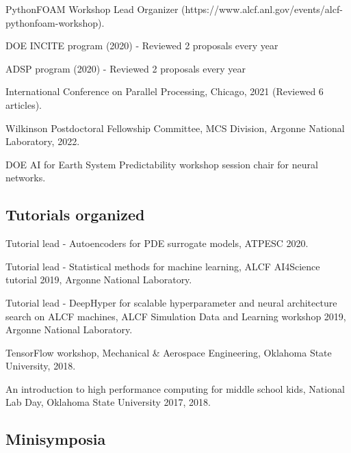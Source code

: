 \documentclass[letterpaper]{article}
\renewenvironment{itemize}{
  \begin{list}{}{
    \setlength{\leftmargin}{1.5em}
  }
}{
  \end{list}
}
\begin{document}
\begin{itemize}
\item PythonFOAM Workshop Lead Organizer (https://www.alcf.anl.gov/events/alcf-pythonfoam-workshop).
\item DOE INCITE program (2020) - Reviewed 2 proposals every year
\item ADSP program (2020) - Reviewed 2 proposals every year
\item International Conference on Parallel Processing, Chicago, 2021 (Reviewed 6 articles).
\item Wilkinson Postdoctoral Fellowship Committee, MCS Division, Argonne National Laboratory, 2022.
\item DOE AI for Earth System Predictability workshop session chair for neural networks.
\end{itemize}

\subsection*{Tutorials organized}

\begin{itemize}
  \item Tutorial lead - Autoencoders for PDE surrogate models, ATPESC 2020.
  \item Tutorial lead - Statistical methods for machine learning, ALCF AI4Science tutorial 2019, Argonne National Laboratory.
  \item Tutorial lead - DeepHyper for scalable hyperparameter and neural architecture search on ALCF machines, ALCF Simulation Data and Learning workshop 2019, Argonne National Laboratory.
  \item TensorFlow workshop, Mechanical \& Aerospace Engineering, Oklahoma State University, 2018.
  \item An introduction to high performance computing for middle school kids, National Lab Day, Oklahoma State University 2017, 2018.
\end{itemize}

\subsection*{Minisymposia}
\end{document}
